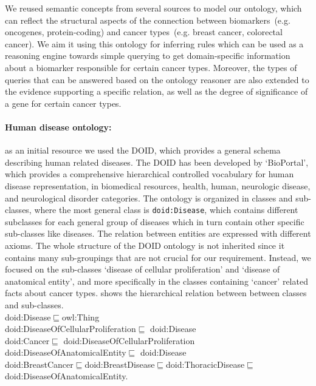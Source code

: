 \hspace*{3.5mm} We reused semantic concepts from several sources to model our ontology, which can reflect the structural aspects of the connection between biomarkers~(e.g. oncogenes, protein-coding) and cancer types~(e.g. breast cancer, colorectal cancer). We aim it using this ontology for inferring rules which can be used as a reasoning engine towards simple querying to get domain-specific information about a biomarker responsible for certain cancer types. Moreover, the types of queries that can be answered based on the ontology reasoner are also extended to the evidence supporting a specific relation, as well as the degree of significance of a gene for certain cancer types. 

\paragraph{Human disease ontology:} \hspace*{-2.5mm} as an initial resource we used the DOID, which provides a general schema describing human related diseases. The DOID has been developed by `BioPortal', which provides a comprehensive hierarchical controlled vocabulary for human disease representation, in biomedical resources, health, human, neurologic disease, and neurological disorder categories. The ontology is organized in classes and sub-classes, where the most general class is \texttt{doid:Disease}, which contains different subclasses for each general group of diseases which in turn contain other specific sub-classes like diseases. The relation between entities are expressed with different axioms. 
\hspace*{3.5mm} The whole structure of the DOID ontology is not inherited since it contains many sub-groupings that are not crucial for our requirement. Instead, we focused on the sub-classes `disease of cellular proliferation' and `disease of anatomical entity', and more specifically in the classes containing `cancer' related facts about cancer types.  shows the hierarchical relation between between classes and sub-classes. \\ 

\vspace{-4mm}
{\scriptsize \noindent doid:Disease$\sqsubseteq$owl:Thing \\
doid:DiseaseOfCellularProliferation$\sqsubseteq$ doid:Disease\\
doid:Cancer$\sqsubseteq$ doid:DiseaseOfCellularProliferation\\
doid:DiseaseOfAnatomicalEntity$\sqsubseteq$ doid:Disease\\ 
doid:BreastCancer$\sqsubseteq$doid:BreastDisease$\sqsubseteq$doid:ThoracicDisease$  \sqsubseteq$doid:DiseaseOfAnatomicalEntity.} \\

